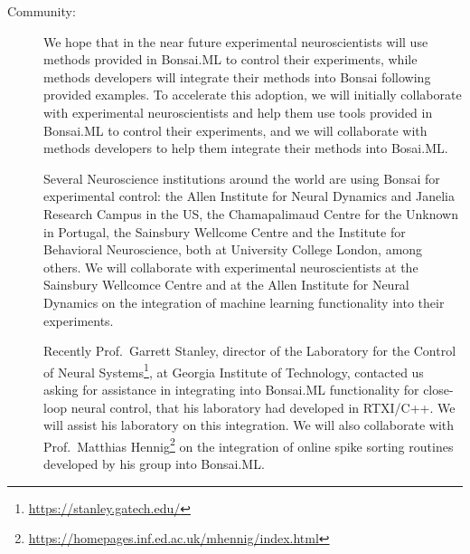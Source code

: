 \begin{description}
    \item[Community:] We hope that in the near future experimental neuroscientists
        will use methods provided in Bonsai.ML to control
        their experiments, while methods developers will integrate
        their methods into Bonsai following provided examples. To accelerate
        this adoption, we will initially collaborate with experimental neuroscientists
        and help them use tools provided in Bonsai.ML to control their
        experiments, and we will collaborate with methods developers to help
        them integrate their methods into Bosai.ML.

        Several Neuroscience institutions around the world are using Bonsai for
        experimental control: the Allen Institute for Neural Dynamics and
        Janelia Research Campus in the US, the Chamapalimaud Centre for the
        Unknown in Portugal, the Sainsbury Wellcome  Centre and the Institute
        for Behavioral Neuroscience, both at University College London, among
        others. We will collaborate with experimental neuroscientists at the
        Sainsbury Wellcomce Centre and at the Allen Institute for Neural
        Dynamics on the integration of machine learning functionality into
        their experiments.

        Recently Prof.~Garrett Stanley, director of the Laboratory for the
        Control of Neural
        Systems\footnote[11]{\url{https://stanley.gatech.edu/}}, at Georgia
        Institute of Technology, contacted us asking for assistance in
        integrating into Bonsai.ML functionality for close-loop neural control,
        that his laboratory had developed in RTXI/C++. We will assist his
        laboratory on this integration.
        We will also collaborate with Prof.~Matthias
        Hennig\footnote[12]{\url{https://homepages.inf.ed.ac.uk/mhennig/index.html}}
        on the integration of online spike sorting routines developed by his
        group into Bonsai.ML.

\end{description}


